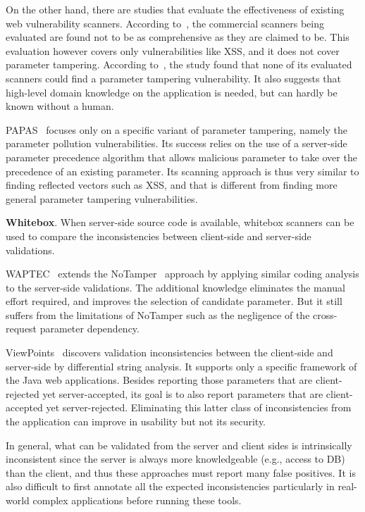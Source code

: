 \documentclass[letter]{sig-alternate-2013}
\begin{document}
On the other hand, there are studies that evaluate the effectiveness of existing web vulnerability scanners. According to~\cite{blackboxeval}, the commercial scanners being evaluated are found not to be as comprehensive as they are claimed to be. This evaluation however covers only vulnerabilities like XSS, and it does not cover parameter tampering. According to~\cite{whyjohnny}, the study found that none of its evaluated scanners could find a parameter tampering vulnerability. It also suggests that high-level domain knowledge on the application is needed, but can hardly be known without a human.

PAPAS~\cite{parampollution} focuses only on a specific variant of parameter tampering, namely the parameter pollution vulnerabilities. Its success relies on the use of a server-side parameter precedence algorithm that allows malicious parameter to take over the precedence of an existing parameter. Its scanning approach is thus very similar to finding reflected vectors such as XSS, and that is different from finding more general parameter tampering vulnerabilities.

\textbf{Whitebox}. When server-side source code is available, whitebox scanners can be used to compare the inconsistencies between client-side and server-side validations.

WAPTEC~\cite{waptec} extends the NoTamper~\cite{notamper} approach by applying similar coding analysis to the server-side validations. The additional knowledge eliminates the manual effort required, and improves the selection of candidate parameter. But it still suffers from the limitations of NoTamper such as the negligence of the cross-request parameter dependency.

ViewPoints~\cite{viewpoints} discovers validation inconsistencies between the client-side and server-side by differential string analysis. It supports only a specific framework of the Java web applications. Besides reporting those parameters that are client-rejected yet server-accepted, its goal is to also report parameters that are client-accepted yet server-rejected. Eliminating this latter class of inconsistencies from the application can improve in usability but not its security.

In general, what can be validated from the server and client sides is intrinsically inconsistent since the server is always more knowledgeable (e.g., access to DB) than the client, and thus these approaches must report many false positives. It is also difficult to first annotate all the expected inconsistencies particularly in real-world complex applications before running these tools.
\end{document}
